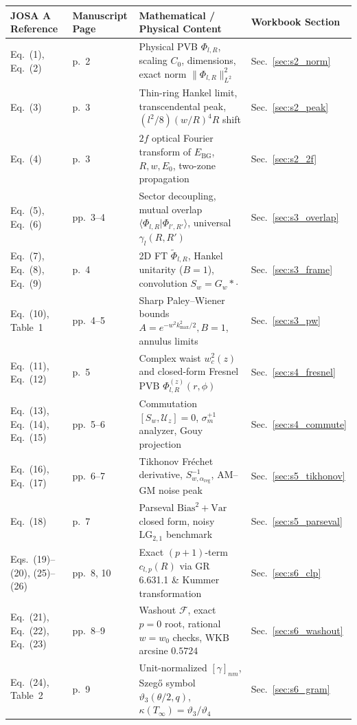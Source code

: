 \documentclass[10pt,letterpaper]{article}
\newcommand{\braket}[2]{\langle #1 | #2 \rangle}
\newcommand{\norm}[1]{\lVert #1 \rVert}
\numberwithin{equation}{section}
\begin{document}
\begin{table}[ht!]
\centering
\scriptsize
\renewcommand{\arraystretch}{1.15}
\setlength{\tabcolsep}{4pt}
\begin{tabular}{@{}llll@{}}
\toprule
\textbf{JOSA A Reference} & \textbf{Manuscript Page} & \textbf{Mathematical / Physical Content} & \textbf{Workbook Section} \\
\midrule
Eq.~(1), Eq.~(2) & p.~2 & Physical PVB $\Phi_{l,R}$, scaling $C_0$, dimensions, exact norm $\norm{\Phi_{l,R}}_{L^2}^2$ & Sec.~\ref{sec:s2_norm} \\
Eq.~(3) & p.~3 & Thin-ring Hankel limit, transcendental peak, $(l^2/8)(w/R)^4 R$ shift & Sec.~\ref{sec:s2_peak} \\
Eq.~(4) & p.~3 & $2f$ optical Fourier transform of $E_{\mathrm{BG}}$, $R, w, E_0$, two-zone propagation & Sec.~\ref{sec:s2_2f} \\
Eq.~(5), Eq.~(6) & pp.~3--4 & Sector decoupling, mutual overlap $\braket{\Phi_{l,R}}{\Phi_{l',R'}}$, universal $\gamma_l(R,R')$ & Sec.~\ref{sec:s3_overlap} \\
Eq.~(7), Eq.~(8), Eq.~(9) & p.~4 & 2D FT $\widetilde{\Phi}_{l,R}$, Hankel unitarity ($B=1$), convolution $S_w = G_w * \cdot$ & Sec.~\ref{sec:s3_frame} \\
Eq.~(10), Table~1 & pp.~4--5 & Sharp Paley--Wiener bounds $A = e^{-w^2 k_{\max}^2/2}, B=1$, annulus limits & Sec.~\ref{sec:s3_pw} \\
Eq.~(11), Eq.~(12) & p.~5 & Complex waist $w_c^2(z)$ and closed-form Fresnel PVB $\Phi_{l,R}^{(z)}(r,\phi)$ & Sec.~\ref{sec:s4_fresnel} \\
Eq.~(13), Eq.~(14), Eq.~(15) & pp.~5--6 & Commutation $[S_w,\mathcal{U}_z]=0$, $\sigma_m^{+1}$ analyzer, Gouy projection & Sec.~\ref{sec:s4_commute} \\
Eq.~(16), Eq.~(17) & pp.~6--7 & Tikhonov Fr\'echet derivative, $S_{w,\alpha_{\mathrm{reg}}}^{-1}$, AM--GM noise peak & Sec.~\ref{sec:s5_tikhonov} \\
Eq.~(18) & p.~7 & Parseval $\mathrm{Bias}^2 + \mathrm{Var}$ closed form, noisy $\mathrm{LG}_{2,1}$ benchmark & Sec.~\ref{sec:s5_parseval} \\
Eqs.~(19)--(20), (25)--(26) & pp.~8, 10 & Exact $(p+1)$-term $c_{l,p}(R)$ via GR 6.631.1 \& Kummer transformation & Sec.~\ref{sec:s6_clp} \\
Eq.~(21), Eq.~(22), Eq.~(23) & pp.~8--9 & Washout $\mathcal{F}$, exact $p=0$ root, rational $w=w_0$ checks, WKB arcsine $0.5724$ & Sec.~\ref{sec:s6_washout} \\
Eq.~(24), Table~2 & p.~9 & Unit-normalized $[\gamma]_{nm}$, Szeg\H{o} symbol $\vartheta_3(\theta/2,q)$, $\kappa(T_\infty) = \vartheta_3/\vartheta_4$ & Sec.~\ref{sec:s6_gram} \\
\bottomrule
\end{tabular}
\end{table}
\end{document}

